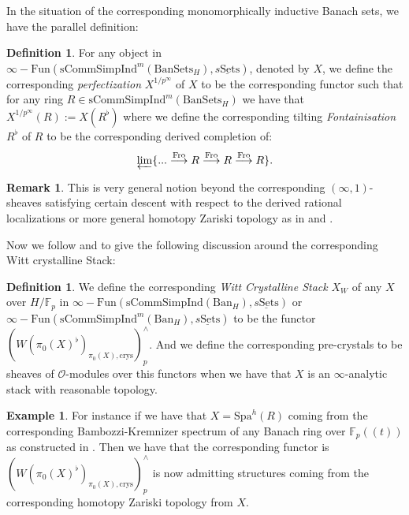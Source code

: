 \documentclass[12pt]{amsart}
\theoremstyle{definition}
\newtheorem{definition}[theorem]{Definition}
\newtheorem{remark}[theorem]{Remark}
\numberwithin{equation}{section}
\newtheorem{example}[theorem]{Example}
\begin{document}
\indent In the situation of the corresponding monomorphically inductive Banach sets, we have the parallel definition:


\begin{definition}
For any object in $\infty-\mathrm{Fun}(\mathrm{sComm}\mathrm{Simp}\mathrm{Ind}^m(\mathrm{BanSets}_H),\underline{s\mathrm{Sets}})$, denoted by $X$, we define the corresponding \textit{perfectization} $X^{1/p^\infty}$ of $X$ to be the corresponding functor such that for any ring $R\in \mathrm{sComm}\mathrm{Simp}\mathrm{Ind}^m(\mathrm{BanSets}_H)$ we have that $X^{1/p^\infty}(R):=X(R^\flat)$ where we define the corresponding tilting \textit{Fontainisation} $R^\flat$ of $R$ to be the corresponding derived completion of:
\begin{align}
\varprojlim\{ ...\overset{\mathrm{Fro}}{\longrightarrow}	R \overset{\mathrm{Fro}}{\longrightarrow} R \overset{\mathrm{Fro}}{\longrightarrow} R\}.
\end{align}

	
\end{definition}






\begin{remark}
This is very general notion beyond the corresponding $(\infty,1)$-sheaves satisfying certain descent with respect to the derived rational localizations or more general homotopy Zariski topology as in \cite{BK} and \cite{BBBK}. 	
\end{remark}

\indent Now we follow \cite[Proposition 5.3]{R} and \cite[Section 1.1]{Dr1} to give the following discussion around the corresponding Witt crystalline Stack:

\begin{definition}
We define the corresponding \textit{Witt Crystalline Stack} $X_W$ of any $X$ over $H/\mathbb{F}_p$ in $\infty-\mathrm{Fun}(\mathrm{sComm}\mathrm{Simp}\mathrm{Ind}(\mathrm{Ban}_H),\underline{s\mathrm{Sets}})$ or $\infty-\mathrm{Fun}(\mathrm{sComm}\mathrm{Simp}\mathrm{Ind}^m(\mathrm{Ban}_H),\underline{s\mathrm{Sets}})$ to be the functor $(W(\pi_0(X)^\flat)_{\pi_0(X),\mathrm{crys}})_p^\wedge$. And we define the corresponding pre-crystals to be sheaves of $\mathcal{O}$-modules over this functors when we have that $X$ is an $\infty$-analytic stack with reasonable topology.	
\end{definition}

\begin{example}
For instance if we have that $X=\mathrm{Spa}^h(R)$ coming from the corresponding Bambozzi-Kremnizer spectrum of any Banach ring over $\mathbb{F}_p((t))$ as constructed in \cite{BK}. Then we have that the corresponding functor is $(W(\pi_0(X)^\flat)_{\pi_0(X),\mathrm{crys}})_{p}^\wedge$ is now admitting structures coming from the corresponding homotopy Zariski topology from $X$.	
\end{example}
\end{document}
